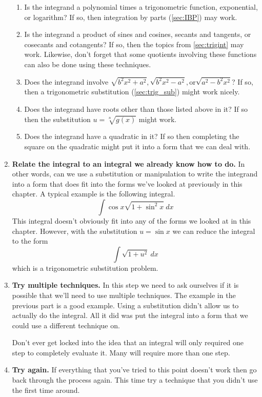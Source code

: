 \begin{enumerate}
\begin{enumerate}
\item Is the integrand a polynomial times a trigonometric function, exponential, or logarithm? If so, then integration by parts (\autoref{sec:IBP}) may work.

\item Is the integrand a product of sines and cosines, secants and tangents, or cosecants and cotangents? If so, then the topics from \autoref{sec:trigint} may work. Likewise, don't forget that some quotients involving these functions can also be done using these techniques.

\item Does the integrand involve $\sqrt {b^2x^2 + a^2}, \sqrt {b^2x^2 - a^2}, \text{or} \sqrt { a^2-b^2x^2}$? If so, then a trigonometric substitution (\autoref{sec:trig_sub}) might work nicely.

\item Does the integrand have roots other than those listed above in it? If so then the substitution $u=\sqrt[n]{g(x)}$ might work.

\item Does the integrand have a quadratic in it? If so then completing the square on the quadratic might put it into a form that we can deal with. 
\end{enumerate}

\item \textbf{Relate the integral to an integral we already know how to do.} In other words, can we use a substitution or manipulation to write the integrand into a  form that does fit into the forms we've looked at previously in this chapter. A typical example is the following integral.
\[\int \cos x\sqrt{1 + \sin^2 x}\ dx\]
This integral doesn't obviously fit into any of the forms we looked at in this chapter. However, with the substitution $u = \sin x$ we can reduce the integral to the form
\[\int \sqrt{1+u^2}\ dx\]
which is a trigonometric substitution problem.

\item \textbf{Try multiple techniques.} In this step we need to ask ourselves if it is possible that we'll need to use multiple techniques. The example in the previous part is a good example. Using a substitution didn't allow us to actually do the integral. All it did was put the integral into a form that we could use a different technique on.

Don't ever get locked into the idea that an integral will only required one step to completely evaluate it. Many will require more than one step.

\item \textbf{Try again.} If everything that you've tried to this point doesn't work then go back through the process again. This time try a technique that you didn't use the first time around.
\end{enumerate}

